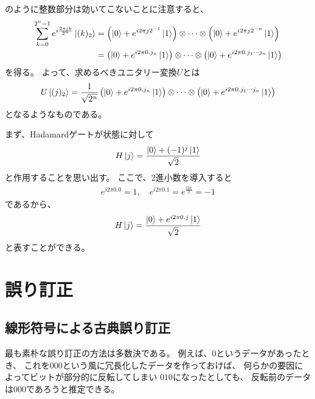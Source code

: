 \documentclass[]{ltjsarticle}
\begin{document}
のように整数部分は効いてこないことに注意すると、
\begin{align}
    \sum_{k=0}^{2^n-1}
    e^{i\frac{2\pi jk}{2^n}}
    \ket{(k)_2}    
    &=
    \left(
        \ket{0} 
        + 
        e^{i2\pi j 2^{-1}} \ket{1}
    \right)
    \otimes 
    \cdots 
    \otimes 
    \left(
        \ket{0} 
        + 
        e^{i2\pi j 2^{-n}} \ket{1}
    \right) \\
    &=
    \left(
        \ket{0} 
        + 
        e^{i2\pi 0.j_n} \ket{1}
    \right)
    \otimes 
    \cdots 
    \otimes 
    \left(
        \ket{0} 
        + 
        e^{i2\pi 0.j_1 \cdots j_n} \ket{1}
    \right)
\end{align}
を得る。
よって、求めるべきユニタリー変換$U$とは
\begin{align}
    U \ket{(j)_2}
    =
    \frac{1}{\sqrt{2^n}}
    \left(
        \ket{0} 
        + 
        e^{i2\pi 0.j_n} \ket{1}
    \right)
    \otimes 
    \cdots 
    \otimes 
    \left(
        \ket{0} 
        + 
        e^{i2\pi 0.j_1 \cdots j_n} \ket{1}
    \right)
\end{align}
となるようなものである。

まず、Hadamardゲートが状態に対して
\begin{align}
    H \ket{j} 
    = \frac{\ket{0} + (-1)^{j}\ket{1}}{\sqrt{2}}
\end{align}
と作用することを思い出す。
ここで、2進小数を導入すると
\begin{align}
    e^{i 2\pi 0.0} = 1, \quad 
    e^{i 2\pi 0.1} = e^{\frac{i 2\pi}{2}} = -1
\end{align}
であるから、
\begin{align}
    H \ket{j} 
    = \frac{\ket{0} + e^{i 2\pi 0.j}\ket{1}}{\sqrt{2}}
\end{align}
と表すことができる。




\section{誤り訂正}
\subsection{線形符号による古典誤り訂正}
最も素朴な誤り訂正の方法は多数決である。
例えば、$0$というデータがあったとき、
これを$000$という風に冗長化したデータを作っておけば、
何らかの要因によってビットが部分的に反転してしまい
$010$になったとしても、
反転前のデータは$000$であろうと推定できる。
\end{document}
